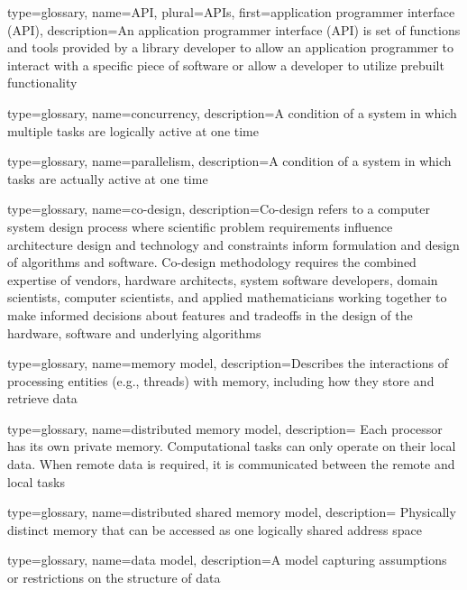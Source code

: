 {
  type=glossary,
  name={API},
  plural={APIs},
  first={application programmer interface (API)},
  description={An application programmer interface (API) is set of functions and tools provided by a library developer to allow an application programmer to interact with a specific piece of software or allow a developer to utilize prebuilt functionality}
}

{
  type=glossary,
  name={concurrency},
  description={A condition of a system in which multiple tasks are logically
    active at one time}
}

{
  type=glossary,
  name={parallelism},
  description={A condition of a system in which tasks are actually active at
    one time}
}

{
  type=glossary,
  name=co-design,
  description={Co-design refers to a computer system design process where
    scientific problem requirements influence architecture design and
      technology and constraints inform formulation and design of algorithms
      and software.  Co-design methodology requires the combined expertise of
      vendors, hardware architects, system software developers, domain
      scientists, computer scientists, and applied mathematicians working
      together to make informed decisions about features and tradeoffs in the
      design of the hardware, software and underlying
      algorithms~\cite{co-design}}
}

{
  type=glossary,
  name={memory model},
  description={Describes the interactions of processing entities (e.g.,
      threads) with memory, including how they store and retrieve data}
}

{
  type=glossary,
  name={distributed memory model},
  description={ Each processor has its own private memory. 
     Computational tasks can only operate on their local data. When remote data
     is required, it is communicated between the remote and local tasks}
}

{
  type=glossary,
  name={distributed shared memory model},
  description={ Physically distinct memory that can be accessed as one
    logically shared address space}
}

{
  type=glossary,
  name={data model},
  description={A model capturing assumptions or restrictions on the structure of data}
}


